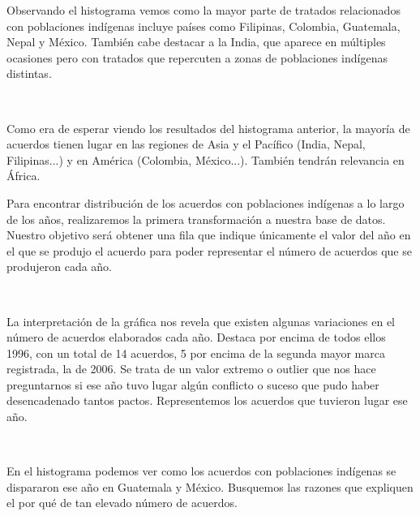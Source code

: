 \documentclass[11pt]{article}
\begin{document}
    Observando el histograma vemos como la mayor parte de tratados
relacionados con poblaciones indígenas incluye países como Filipinas,
Colombia, Guatemala, Nepal y México. También cabe destacar a la India,
que aparece en múltiples ocasiones pero con tratados que repercuten a
zonas de poblaciones indígenas distintas.

    \begin{center}
    \end{center}
    { \hspace*{\fill} \\}
    
    Como era de esperar viendo los resultados del histograma anterior, la
mayoría de acuerdos tienen lugar en las regiones de Asia y el Pacífico
(India, Nepal, Filipinas...) y en América (Colombia, México...). También
tendrán relevancia en África.

    Para encontrar distribución de los acuerdos con poblaciones indígenas a
lo largo de los años, realizaremos la primera transformación a nuestra
base de datos. Nuestro objetivo será obtener una fila que indique
únicamente el valor del año en el que se produjo el acuerdo para poder
representar el número de acuerdos que se produjeron cada año.

    \begin{center}
    \end{center}
    { \hspace*{\fill} \\}
    
    La interpretación de la gráfica nos revela que existen algunas
variaciones en el número de acuerdos elaborados cada año. Destaca por
encima de todos ellos 1996, con un total de 14 acuerdos, 5 por encima de
la segunda mayor marca registrada, la de 2006. Se trata de un valor extremo
o outlier que nos hace preguntarnos si ese año tuvo lugar algún
conflicto o suceso que pudo haber desencadenado tantos pactos.
Representemos los acuerdos que tuvieron lugar ese año.

    \begin{center}
    \end{center}
    { \hspace*{\fill} \\}
    
    En el histograma podemos ver como los acuerdos con poblaciones indígenas
se dispararon ese año en Guatemala y México. Busquemos las razones que
expliquen el por qué de tan elevado número de acuerdos.
\end{document}
